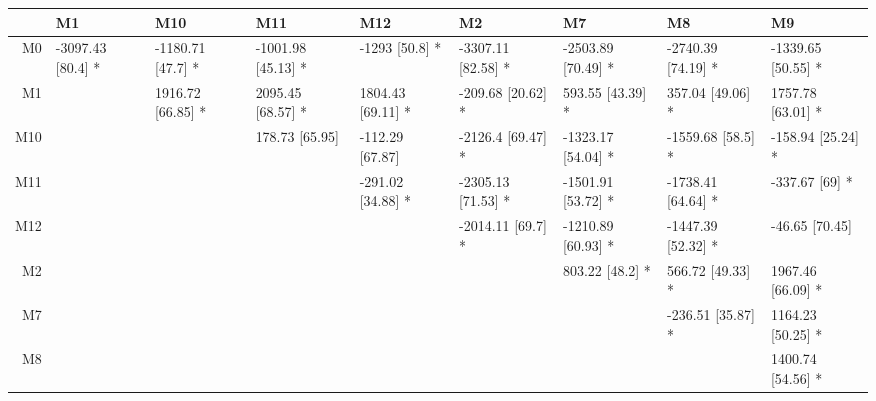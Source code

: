 \begin{table}[ht]
\centering
\begin{tabular}{rllllllll}
  \hline
 & M1 & M10 & M11 & M12 & M2 & M7 & M8 & M9 \\ 
  \hline
M0 & -3097.43 [80.4] * & -1180.71 [47.7] * & -1001.98 [45.13] * & -1293 [50.8] * & -3307.11 [82.58] * & -2503.89 [70.49] * & -2740.39 [74.19] * & -1339.65 [50.55] * \\ 
  M1 &  & 1916.72 [66.85] * & 2095.45 [68.57] * & 1804.43 [69.11] * & -209.68 [20.62] * & 593.55 [43.39] * & 357.04 [49.06] * & 1757.78 [63.01] * \\ 
  M10 &  &  & 178.73 [65.95] & -112.29 [67.87] & -2126.4 [69.47] * & -1323.17 [54.04] * & -1559.68 [58.5] * & -158.94 [25.24] * \\ 
  M11 &  &  &  & -291.02 [34.88] * & -2305.13 [71.53] * & -1501.91 [53.72] * & -1738.41 [64.64] * & -337.67 [69] * \\ 
  M12 &  &  &  &  & -2014.11 [69.7] * & -1210.89 [60.93] * & -1447.39 [52.32] * & -46.65 [70.45] \\ 
  M2 &  &  &  &  &  & 803.22 [48.2] * & 566.72 [49.33] * & 1967.46 [66.09] * \\ 
  M7 &  &  &  &  &  &  & -236.51 [35.87] * & 1164.23 [50.25] * \\ 
  M8 &  &  &  &  &  &  &  & 1400.74 [54.56] * \\ 
   \hline
\end{tabular}
\end{table}
